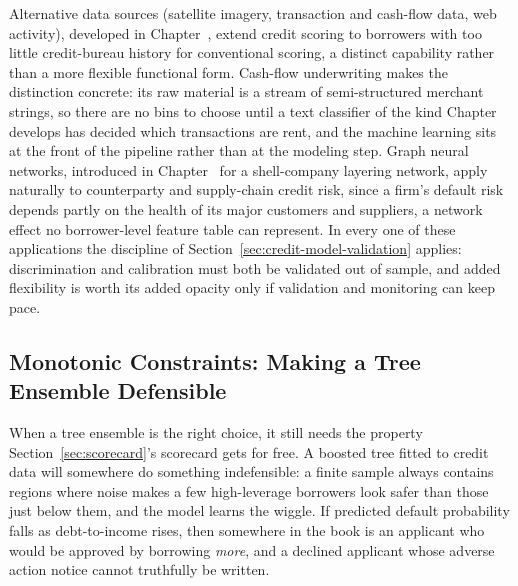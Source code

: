 \documentclass[../ai_in_finance]{subfiles}
\begin{document}
Alternative data sources (satellite imagery, transaction and cash-flow data, web activity), developed in Chapter~, extend credit scoring to borrowers with too little credit-bureau history for conventional scoring, a distinct capability rather than a more flexible functional form. Cash-flow underwriting makes the distinction concrete: its raw material is a stream of semi-structured merchant strings, so there are no bins to choose until a text classifier of the kind Chapter~ develops has decided which transactions are rent, and the machine learning sits at the front of the pipeline rather than at the modeling step.
Graph neural networks, introduced in Chapter~ for a shell-company layering network, apply naturally to counterparty and supply-chain credit risk, since a firm's default risk depends partly on the health of its major customers and suppliers, a network effect no borrower-level feature table can represent.
In every one of these applications the discipline of Section~\ref{sec:credit-model-validation} applies: discrimination and calibration must both be validated out of sample, and added flexibility is worth its added opacity only if validation and monitoring can keep pace.


\subsection{Monotonic Constraints: Making a Tree Ensemble Defensible}
\label{sec:monotonic}

When a tree ensemble is the right choice, it still needs the property Section~\ref{sec:scorecard}'s scorecard gets for free. A boosted tree fitted to credit data will somewhere do something indefensible: a finite sample always contains regions where noise makes a few high-leverage borrowers look safer than those just below them, and the model learns the wiggle. If predicted default probability falls as debt-to-income rises, then somewhere in the book is an applicant who would be approved by borrowing \emph{more}, and a declined applicant whose adverse action notice cannot truthfully be written.
\end{document}
